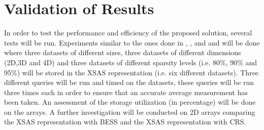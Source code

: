 %
%
%
%
%
\chapter{Validation of Results} \label{chap:validationofresults}
\vspace{-1cm}

In order to test the performance and efficiency of the proposed solution, several tests will be run. Experiments similar to the ones done in \cite{otoo:2013:ced}, \cite{pedereira:2015:cas}, \cite{otoo:2016:msa} and \cite{goil:bess} and will be done where three datasets of different sizes, three datasets of different dimensions (2D,3D and 4D) and three datasets of different sparsity levels (i.e. 80\%, 90\% and 95\%) will be stored in the XSAS representation (i.e. six different datasets). Three different queries will be run and timed on the datasets, these queries will be run three times each in order to ensure that an accurate average measurement has been taken. An assessment of the storage utilization (in percentage) will be done on the arrays. A further investigation will be conducted on 2D arrays comparing the XSAS representation with BESS and the XSAS representation with CRS.